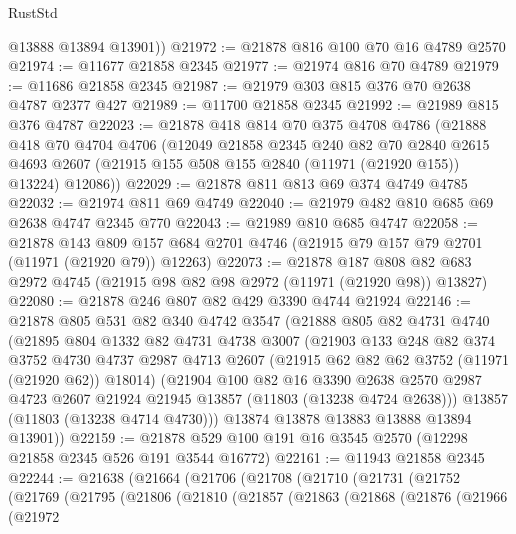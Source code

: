 \begin{lexlean}{RustStd}
\begin{coremodule}
        @13888
        @13894
        @13901))
@21972 := @21878 @816 @100 @70 @16 @4789 @2570
@21974 := @11677 @21858 @2345
@21977 := @21974 @816 @70 @4789
@21979 := @11686 @21858 @2345
@21987 := @21979 @303 @815 @376 @70 @2638 @4787 @2377 @427
@21989 := @11700 @21858 @2345
@21992 := @21989 @815 @376 @4787
@22023 := @21878
    @418
    @814
    @70
    @375
    @4708
    @4786
    (@21888
      @418
      @70
      @4704
      @4706
      (@12049
        @21858
        @2345
        @240
        @82
        @70
        @2840
        @2615
        @4693
        @2607
        (@21915 @155 @508 @155 @2840 (@11971 (@21920 @155)) @13224)
        @12086))
@22029 := @21878 @811 @813 @69 @374 @4749 @4785
@22032 := @21974 @811 @69 @4749
@22040 := @21979 @482 @810 @685 @69 @2638 @4747 @2345 @770
@22043 := @21989 @810 @685 @4747
@22058 := @21878
    @143
    @809
    @157
    @684
    @2701
    @4746
    (@21915 @79 @157 @79 @2701 (@11971 (@21920 @79)) @12263)
@22073 := @21878
    @187
    @808
    @82
    @683
    @2972
    @4745
    (@21915 @98 @82 @98 @2972 (@11971 (@21920 @98)) @13827)
@22080 := @21878 @246 @807 @82 @429 @3390 @4744 @21924
@22146 := @21878
    @805
    @531
    @82
    @340
    @4742
    @3547
    (@21888
      @805
      @82
      @4731
      @4740
      (@21895
        @804
        @1332
        @82
        @4731
        @4738
        @3007
        (@21903
          @133
          @248
          @82
          @374
          @3752
          @4730
          @4737
          @2987
          @4713
          @2607
          (@21915 @62 @82 @62 @3752 (@11971 (@21920 @62)) @18014)
          (@21904
            @100
            @82
            @16
            @3390
            @2638
            @2570
            @2987
            @4723
            @2607
            @21924
            @21945
            @13857
            (@11803 (@13238 @4724 @2638)))
          @13857
          (@11803 (@13238 @4714 @4730)))
        @13874
        @13878
        @13883
        @13888
        @13894
        @13901))
@22159 := @21878 @529 @100 @191 @16 @3545 @2570 (@12298 @21858 @2345 @526 @191 @3544 @16772)
@22161 := @11943 @21858 @2345
@22244 := @21638
    (@21664
      (@21706
        (@21708
          (@21710
            (@21731
              (@21752
                (@21769
                  (@21795
                    (@21806
                      (@21810
                        (@21857
                          (@21863
                            (@21868
                              (@21876
                                (@21966
                                  (@21972

\end{coremodule}
\end{lexlean}
